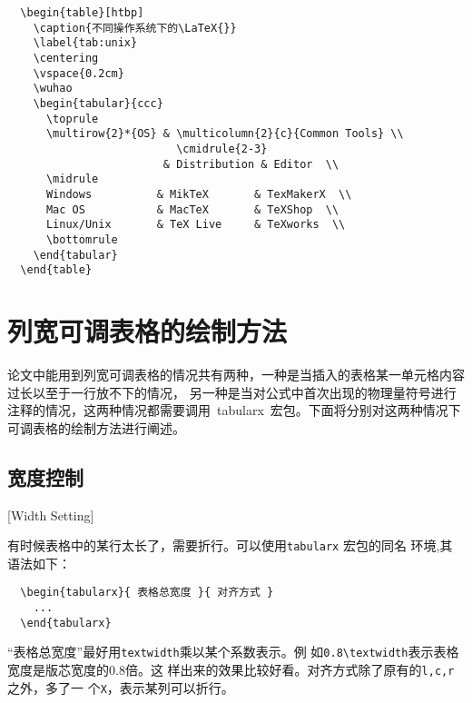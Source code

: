 \begin{lstlisting}
  \begin{table}[htbp]
    \caption{不同操作系统下的\LaTeX{}}
    \label{tab:unix}
    \centering
    \vspace{0.2cm}
    \wuhao
    \begin{tabular}{ccc}
      \toprule
      \multirow{2}*{OS} & \multicolumn{2}{c}{Common Tools} \\
                          \cmidrule{2-3}
                        & Distribution & Editor  \\
      \midrule
      Windows          & MikTeX       & TexMakerX  \\
      Mac OS           & MacTeX       & TeXShop  \\
      Linux/Unix       & TeX Live     & TeXworks  \\
      \bottomrule
    \end{tabular}
  \end{table}
\end{lstlisting}

\section{列宽可调表格的绘制方法}

论文中能用到列宽可调表格的情况共有两种，一种是当插入的表格某一单元格内容过长以至于一行放不下的情况，
另一种是当对公式中首次出现的物理量符号进行注释的情况，这两种情况都需要调用~tabularx~宏包。下面将分别对这两种情况下可调表格的绘制方法进行阐述。

\subsection{宽度控制}[Width Setting]

有时候表格中的某行太长了，需要折行。可以使用\texttt{tabularx} 宏包的同名
环境,其语法如下：

\begin{lstlisting}
  \begin{tabularx}{ 表格总宽度 }{ 对齐方式 }
    ...
  \end{tabularx}
\end{lstlisting}

“表格总宽度”最好用\texttt{textwidth}乘以某个系数表示。例
如\texttt{0.8\textbackslash{textwidth}}表示表格宽度是版芯宽度的0.8倍。这
样出来的效果比较好看。对齐方式除了原有的\texttt{l,c,r}之外，多了一
个\texttt{X}，表示某列可以折行。

